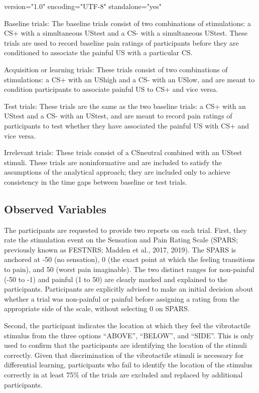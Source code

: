 version="1.0" encoding="UTF-8" standalone="yes" \documentclass{article}
\begin{document}
Baseline trials: The baseline trials consist of two combinations of stimulations: a CS+ with a simultaneous UStest and a CS- with a simultaneous UStest. These trials are used to record baseline pain ratings of participants before they are conditioned to associate the painful US with a particular CS.

Acquisition or learning trials: These trials consist of two combinations of stimulations: a CS+ with an UShigh and a CS- with an USlow, and are meant to condition participants to associate painful US to CS+ and vice versa.

Test trials: These trials are the same as the two baseline trials: a CS+ with an UStest and a CS- with an UStest, and are meant to record pain ratings of participants to test whether they have associated the painful US with CS+ and vice versa.

Irrelevant trials: These trials consist of a CSneutral combined with an UStest stimuli. These trials are noninformative and are included to satisfy the assumptions of the analytical approach; they are included only to achieve consistency in the time gaps between baseline or test trials. 

\subsection{Observed Variables}

The participants are requested to provide two reports on each trial. First, they rate the stimulation event on the Sensation and Pain Rating Scale (SPARS; previously known as FESTNRS; Madden et al., 2017, 2019). The SPARS is anchored at -50 (no sensation), 0 (the exact point at which the feeling transitions to pain), and 50 (worst pain imaginable). The two distinct ranges for non-painful (-50 to -1) and painful (1 to 50) are clearly marked and explained to the participants. Participants are explicitly advised to make an initial decision about whether a trial was non-painful or painful before assigning a rating from the appropriate side of the scale, without selecting 0 on SPARS. 

Second, the participant indicates the location at which they feel the vibrotactile stimulus from the three options “ABOVE”, “BELOW”, and “SIDE”. This is only used to confirm that the participants are identifying the location of the stimuli correctly. Given that discrimination of the vibrotactile stimuli is necessary for differential learning, participants who fail to identify the location of the stimulus correctly in at least 75\% of the trials are excluded and replaced by additional participants.
\end{document}
